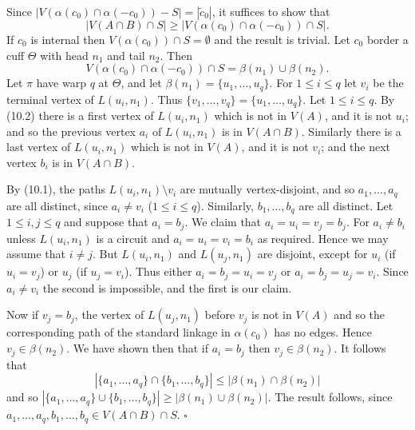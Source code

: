 Since $|V(\alpha(c_0) \cap \alpha(-c_0)) - S| = |\tilde{c}_0|$, it suffices to show that
\begin{equation*}
|V(A \cap B) \cap S| \ge |V(\alpha(c_0) \cap \alpha(-c_0)) \cap S|.
\end{equation*}
If $c_0$ is internal then $V(\alpha(c_0)) \cap S = \emptyset$ and the result is trivial. Let $c_0$ border a cuff $\Theta$ with head $n_1$ and tail $n_2$. Then
\begin{equation*}
V(\alpha(c_0) \cap \alpha(-c_0)) \cap S = \beta(n_1) \cup \beta(n_2).
\end{equation*}
Let $\pi$ have warp $q$ at $\Theta$, and let $\beta(n_1) = \{u_1, \dots, u_q\}$. For $1 \le i \le q$ let $v_i$ be the terminal vertex of $L(u_i, n_1)$. Thus $\{v_1, \dots, v_q\} = \{u_1, \dots, u_q\}$. Let $1 \le i \le q$. By (10.2) there is a first vertex of $L(u_i, n_1)$ which is not in $V(A)$, and it is not $u_i$; and so the previous vertex $a_i$ of $L(u_i, n_1)$ is in $V(A \cap B)$. Similarly there is a last vertex of $L(u_i, n_1)$ which is not in $V(A)$, and it is not $v_i$; and the next vertex $b_i$ is in $V(A \cap B)$.

By (10.1), the paths $L(u_i, n_1) \setminus v_i$ are mutually vertex-disjoint, and so $a_1, \dots, a_q$ are all distinct, since $a_i \ne v_i$ ($1 \le i \le q$). Similarly, $b_1, \dots, b_q$ are all distinct. Let $1 \le i, j \le q$ and suppose that $a_i = b_j$. We claim that $a_i = u_i = v_j = b_j$. For $a_i \ne b_i$ unless $L(u_i, n_1)$ is a circuit and $a_i = u_i = v_i = b_i$ as required. Hence we may assume that $i \ne j$. But $L(u_i, n_1)$ and $L(u_j, n_1)$ are disjoint, except for $u_i$ (if $u_i = v_j$) or $u_j$ (if $u_j = v_i$). Thus either $a_i = b_j = u_i = v_j$ or $a_i = b_j = u_j = v_i$. Since $a_i \ne v_i$ the second is impossible, and the first is our claim.

Now if $v_j = b_j$, the vertex of $L(u_j, n_1)$ before $v_j$ is not in $V(A)$ and so the corresponding path of the standard linkage in $\alpha(c_0)$ has no edges. Hence $v_j \in \beta(n_2)$. We have shown then that if $a_i = b_j$ then $v_j \in \beta(n_2)$. It follows that
\begin{equation*}
|\{a_1, \dots, a_q\} \cap \{b_1, \dots, b_q\}| \le |\beta(n_1) \cap \beta(n_2)|
\end{equation*}
and so $|\{a_1, \dots, a_q\} \cup \{b_1, \dots, b_q\}| \ge |\beta(n_1) \cup \beta(n_2)|$. The result follows, since $a_1, \dots, a_q, b_1, \dots, b_q \in V(A \cap B) \cap S$. $\square$

